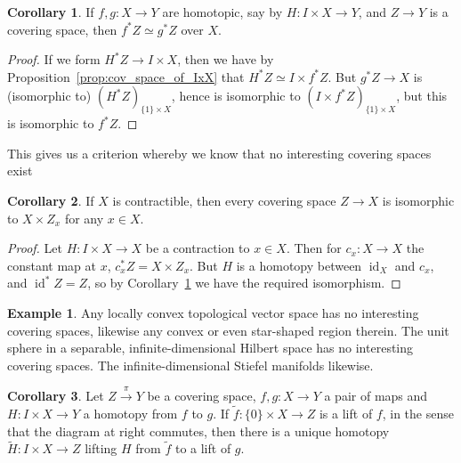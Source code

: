 \documentclass{tufte-handout}
\DeclareMathOperator{\id}{id}
\theoremstyle{definition}
\newtheorem{example}{Example}
\newtheorem{corollary}{Corollary}
\begin{document}
\begin{corollary}\label{prop:pullback_by_homotopic_maps_iso}
If $f,g\colon X\to Y$ are homotopic, say by $H\colon I\times X \to Y$, and $Z\to Y$ is a 
covering space, then $f^*Z\simeq g^*Z$ over $X$.
\end{corollary}

\begin{proof}
If we form $H^*Z\to I\times X$, then we have by Proposition~\ref{prop:cov_space_of_IxX}
that $H^*Z \simeq I\times f^*Z$. But $g^*Z \to X$ is (isomorphic to)  
$(H^*Z)_{\{1\}\times X}$, hence is isomorphic to $(I\times f^*Z)_{\{1\}\times X}$, but this
is isomorphic to $f^*Z$.
\end{proof}

This gives us a criterion whereby we know that no interesting covering spaces exist

\begin{corollary}
If $X$ is contractible, then every covering space $Z\to X$ is isomorphic to $X\times Z_x$ 
for any $x\in X$.
\end{corollary}

\begin{proof}
Let $H\colon I\times X \to X$ be a contraction to $x\in X$. Then for $c_x\colon X\to X$ the 
constant map at $x$, $c_x^*Z = X\times Z_x$. But $H$ is a homotopy between $\id_X$ and $c_x$,
and $\id^*Z = Z$, so by Corollary~\ref{prop:pullback_by_homotopic_maps_iso} we have the required
isomorphism.
\end{proof}

\begin{example}
Any locally convex topological vector space has no interesting covering spaces, likewise any convex or even star-shaped region therein.
The unit sphere in a separable, infinite-dimensional Hilbert space has no interesting covering
spaces. The infinite-dimensional Stiefel manifolds likewise.
\end{example}


\begin{corollary}
Let
$Z\xrightarrow{\pi} Y$ be a covering space, $f,g\colon X\to Y$ a pair of maps and 
$H\colon I\times X\to Y$ a homotopy from $f$ to $g$. If $\widetilde{f}\colon \{0\}\times 
X\to Z$ is a lift of $f$, in the sense that the diagram at right commutes, then there is 
a unique homotopy $\widetilde{H}\colon I\times X \to Z$ lifting $H$ from $\widetilde{f}$ 
to a lift of $g$.
\end{corollary}
\end{document}

